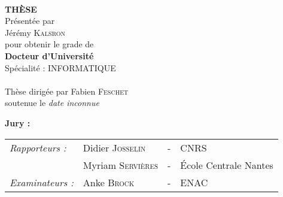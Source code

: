 

\begin{titlepage}
\begin{center}
 \\
\vspace*{0.1cm}
\vspace*{0.1cm}
\vspace*{0.1cm}

\vspace*{0.5cm}
\noindent \Huge \textbf{THÈSE} \\
\vspace*{0.3cm}
\noindent \large {Présentée par\\}
\noindent \LARGE Jérémy \textsc{Kalsron} \\
\vspace*{0.8cm}
\noindent \large {pour obtenir le grade de} \\
\noindent \LARGE \textbf{Docteur d'Université} \\
\vspace*{0.3cm}
\noindent \large {Spécialité : INFORMATIQUE} \\
\vspace*{0.8cm}
 \\
\vspace*{0.8cm}
\noindent \Large Thèse dirigée par Fabien \textsc{Feschet} \\
\vspace*{0.2cm}
\noindent \large soutenue le \textit{date inconnue} \\
\vspace*{0.2cm}
\end{center}
\noindent \large \textbf{Jury :} \\
\begin{center}
\noindent \large 
\begin{tabular}{llcl}
      \textit{Rapporteurs :}	& Didier \textsc{Josselin}		& - & CNRS \\
                              & Myriam \textsc{Servières}		& - & École Centrale Nantes \\
      \textit{Examinateurs :} & Anke \textsc{Brock}		      & - & ENAC  \\

\end{tabular}
\end{center}
\end{titlepage}
